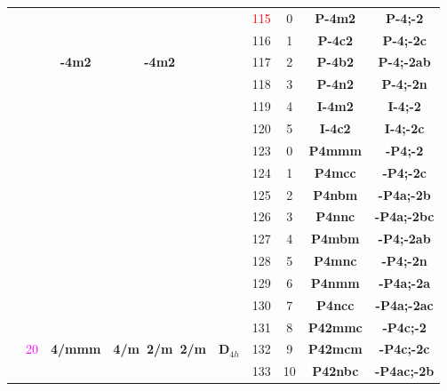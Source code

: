 \documentclass{article}      %
\begin{document}
\begin{small}
\begin{longtable}[c]{|c|c|c|c|c|c|c|c|c|}
	  & & & & &\textrm{\textcolor{red}{115}}  &\textrm{0} &\textbf{P-4m2}       &\textbf{P-4;-2}\\\cline{6-9}        
	  & & & & &\textrm{116}  &\textrm{1} &\textbf{P-4c2}       &\textbf{P-4;-2c}\\\cline{6-9}         
          & & \textbf{-4m2} & \textbf{-4m2} & &\textrm{117}  &\textrm{2} &\textbf{P-4b2}       &\textbf{P-4;-2ab}\\\cline{6-9}      
          & & & & &\textrm{118}  &\textrm{3} &\textbf{P-4n2}       &\textbf{P-4;-2n}\\\cline{6-9}       
          & & & & &\textrm{119}  &\textrm{4} &\textbf{I-4m2}       &\textbf{I-4;-2}\\\cline{6-9}        
          & & & & &\textrm{120}  &\textrm{5} &\textbf{I-4c2}       &\textbf{I-4;-2c}\\\cline{2-9}       
          & & & & &\textrm{123} &\textrm{0} &\textbf{P4mmm}       &\textbf{-P4;-2}\\\cline{6-9}        
          & & & & &\textrm{124} &\textrm{1} &\textbf{P4mcc}       &\textbf{-P4;-2c}\\\cline{6-9}       
          & & & & &\textrm{125} &\textrm{2} &\textbf{P4nbm}       &\textbf{-P4a;-2b}\\\cline{6-9}      
          & & & & &\textrm{126} &\textrm{3} &\textbf{P4nnc}       &\textbf{-P4a;-2bc}\\\cline{6-9}     
          & & & & &\textrm{127} &\textrm{4} &\textbf{P4mbm}       &\textbf{-P4;-2ab}\\\cline{6-9}      
          & & & & &\textrm{128} &\textrm{5} &\textbf{P4mnc}       &\textbf{-P4;-2n}\\\cline{6-9}       
          & & & & &\textrm{129} &\textrm{6} &\textbf{P4nmm}       &\textbf{-P4a;-2a}\\\cline{6-9}      
          & & & & &\textrm{130} &\textrm{7} &\textbf{P4ncc}       &\textbf{-P4a;-2ac}\\\cline{6-9}     
          & & & & &\textrm{131} &\textrm{8} &\textbf{P42mmc}     &\textbf{-P4c;-2}\\\cline{6-9}        
& \textrm{\textcolor{magenta}{20}} &\textbf{4/mmm} &\textbf{4/m~2/m~2/m} &$\mathbf{D}_{4h}$ &\textrm{132} &\textrm{9} &\textbf{P42mcm} &\textbf{-P4c;-2c}\\\cline{6-9}       
          & & & & &\textrm{133} &\textrm{10} &\textbf{P42nbc}     &\textbf{-P4ac;-2b}\\\cline{6-9}      

\end{longtable}
\end{small}
\end{document}
